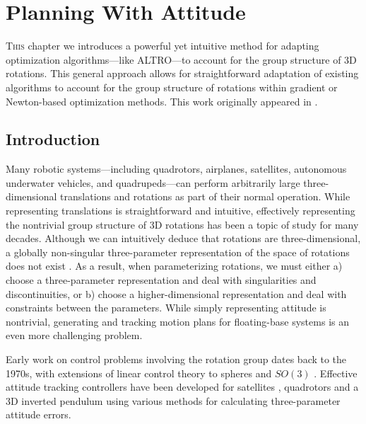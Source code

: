 \documentclass[../root.tex]{subfiles}
\begin{document}
    \chapter{Planning With Attitude} \label{chap:attitude}

    \lettrine{T}{his} chapter we introduces a powerful yet intuitive method for adapting
    optimization algorithms---like ALTRO---to account for the group structure
    of 3D rotations. This general approach allows for straightforward
    adaptation of existing algorithms to account for the group structure of
    rotations within gradient or Newton-based optimization methods. This work
    originally appeared in \cite{jackson_Planning_2021}.

    \section{Introduction}

    Many robotic systems---including quadrotors, airplanes, satellites, autonomous
    underwater vehicles, and quadrupeds---can perform arbitrarily large three-dimensional
    translations and rotations as part of their normal operation. While representing
    translations is straightforward and intuitive, effectively representing the
    nontrivial group structure of 3D rotations has been a topic of study for many
    decades. Although we can intuitively deduce that rotations are three-dimensional, a
    globally non-singular three-parameter representation of the space of rotations does
    not exist \cite{stuelpnagel_Parametrization_1964}. As a result, when parameterizing
    rotations, we must either a) choose a three-parameter representation and deal with
    singularities and discontinuities, or b) choose a higher-dimensional representation and deal with
    constraints between the parameters. While simply representing attitude is nontrivial,
    generating and tracking motion plans for floating-base systems is an even more
    challenging problem.

    Early work on control problems involving the rotation group dates back to the 1970s,
    with extensions of linear control theory to spheres \cite{brockett_Lie_1973} and $SO(3)$
    \cite{baillieul_Geometric_1978}. Effective attitude tracking controllers have been developed for
    satellites \cite{wie_Quaternion_1985}, quadrotors \cite{fresk_Full_2013,liu_QuaternionBased_2015,
    lee_Geometric_2010,johnson_Adaptive_2005} \cite{watterson_Control_2020,mellinger_Minimum_2011}
    and a 3D inverted pendulum
    \cite{chaturvedi_Asymptotic_2009,chaturvedi_Asymptotic_2007}
    using various methods for calculating three-parameter attitude
    errors.
\end{document}
